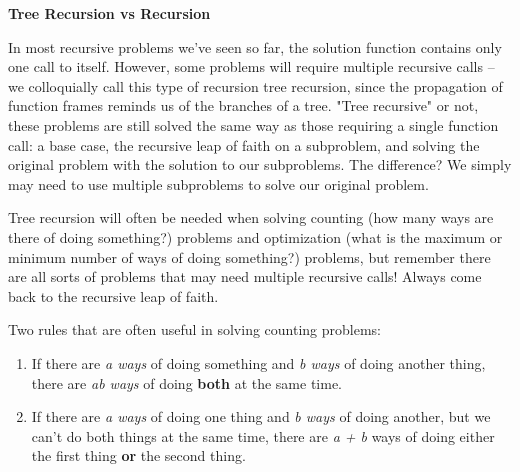 \textbf{Tree Recursion vs Recursion}


In most recursive problems we've seen so far, the solution function contains only one call to itself. However, some problems will require multiple recursive calls -- we colloquially call this type of recursion tree recursion, since the propagation of function frames reminds us of the branches of a tree. "Tree recursive" or not, these problems are still solved the same way as those requiring a single function call: a base case, the recursive leap of faith on a subproblem, and solving the original problem with the solution to our subproblems. The difference? We simply may need to use multiple subproblems to solve our original problem.  

Tree recursion will often be needed when solving counting (how many ways are there of doing something?) problems and optimization (what is the maximum or minimum number of ways of doing something?) problems, but remember there are all sorts of problems that may need multiple recursive calls! Always come back to the recursive leap of faith.

Two rules that are often useful in solving counting problems:
\begin{enumerate}
\item If there are \textit{a ways} of doing something and \textit{b ways} of doing another thing, there are \textit{ab ways} of doing \textbf{both} at the same time.

\item If there are \textit{a ways} of doing one thing and \textit{b ways} of doing another, but we can't do both things at the same time, there are \textit{a + b} ways of doing either the first thing \textbf{or} the second thing.
\end{enumerate}
